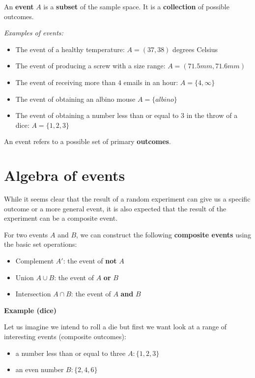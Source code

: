 \documentclass[
]{book}
\providecommand{\tightlist}{%
  \setlength{\itemsep}{0pt}\setlength{\parskip}{0pt}}
\begin{document}
An \textbf{event} \(A\) is a \textbf{subset} of the sample space. It is a \textbf{collection} of possible outcomes.

\emph{Examples of events:}

\begin{itemize}
\tightlist
\item
  The event of a healthy temperature: \(A=(37,38)\) degrees Celsius
\item
  The event of producing a screw with a size range: \(A = (71.5mm, 71.6mm)\)
\item
  The event of receiving more than \(4\) emails in an hour: \(A= \{ 4, \infty \}\)
\item
  The event of obtaining an albino mouse \(A=\{albino\}\)
\item
  The event of obtaining a number less than or equal to 3 in the throw of a dice: \(A= \{ 1,2,3\}\)
\end{itemize}

An event refers to a possible set of primary \textbf{outcomes}.

\hypertarget{algebra-of-events}{%
\section{Algebra of events}\label{algebra-of-events}}

While it seems clear that the result of a random experiment can give us a specific outcome or a more general event, it is also expected that the result of the experiment can be a composite event.

For two events \(A\) and \(B\), we can construct the following \textbf{composite events} using the basic set operations:

\begin{itemize}
\tightlist
\item
  Complement \(A'\): the event of \textbf{not} \(A\)
\item
  Union \(A \cup B\): the event of \(A\) \textbf{or} \(B\)
\item
  Intersection \(A \cap B\): the event of \(A\) \textbf{and} \(B\)
\end{itemize}

\textbf{Example (dice)}

Let us imagine we intend to roll a die but first we want look at a range of interesting events (composite outcomes):

\begin{itemize}
\tightlist
\item
  a number less than or equal to three \(A:\{ 1,2,3\}\)
\item
  an even number \(B:\{ 2,4,6\}\)
\end{itemize}
\end{document}

